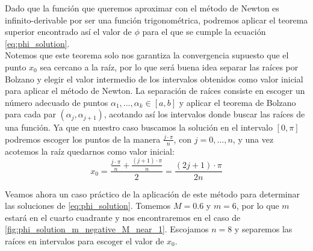 \documentclass[11pt]{article}
\newcommand\ddfrac[2]{\frac{\displaystyle #1}{\displaystyle #2}}
\begin{document}
Dado que la función que queremos aproximar con el método de Newton es infinito-derivable por ser una función trigonométrica, podremos aplicar el teorema superior encontrado así el valor de $\phi$ para el que se cumple la ecuación \eqref{eq:phi_solution}.\\

Notemos que este teorema solo nos garantiza la convergencia supuesto que el punto $x_0$ sea cercano a la raíz, por lo que será buena idea separar las raíces por Bolzano y elegir el valor intermedio de los intervalos obtenidos como valor inicial para aplicar el método de Newton. La separación de raíces consiste en escoger un número adecuado de puntos $\alpha_1,...,\alpha_k\in[a,b]$ y aplicar el teorema de Bolzano para cada par $(\alpha_j,\alpha_{j+1})$, acotando así los intervalos donde buscar las raíces de una función. Ya que en nuestro caso buscamos la solución en el intervalo $[0,\pi]$ podremos escoger los puntos de la manera $\frac{j\cdot \pi}{n}$, con $j=0,...,n$, y una vez acotemos la raíz quedarnos como valor inicial:
\[
x_0=\ddfrac{\ddfrac{j\cdot\pi}{n}+\ddfrac{(j+1)\cdot\pi}{n}}{2}=\ddfrac{(2j+1)\cdot\pi}{2n}
\]

Veamos ahora un caso práctico de la aplicación de este método para determinar las soluciones de \eqref{eq:phi_solution}. Tomemos $M=0.6$ y $m=6$, por lo que $m$ estará en el cuarto cuadrante y nos encontraremos en el caso de \ref{fig:phi_solution_m_negative_M_near_1}. Escojamos $n=8$ y separemos las raíces en intervalos para escoger el valor de $x_0$.
\begin{table}[H]
\centering
{}
\end{table}
\end{document}
